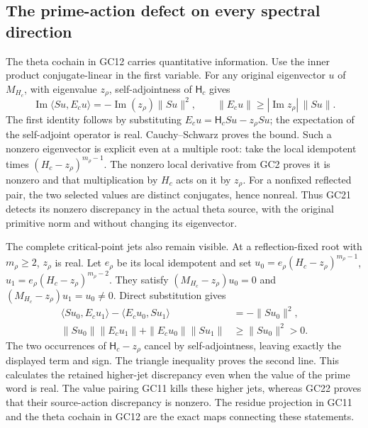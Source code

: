 \subsection{The prime-action defect on every spectral direction}
The theta cochain in GC12 carries quantitative information.
Use the inner product conjugate-linear in the first variable.
For any original eigenvector $u$ of $M_{H_c}$, with eigenvalue
$z_\rho$, self-adjointness of $\mathsf H_c$ gives
\[
 \operatorname{Im}\langle Su,E_cu\rangle
       =-\operatorname{Im}(z_\rho)\|Su\|^2,
 \qquad
 \|E_cu\|\ge |\operatorname{Im}z_\rho|\,\|Su\|.
 \tag{GC21}\label{gc:nonreal-defect}
\]
The first identity follows by substituting
$E_cu=\mathsf H_cSu-z_\rho Su$; the expectation of the
self-adjoint operator is real. Cauchy--Schwarz proves the bound.
Such a nonzero eigenvector is explicit even at a multiple root:
take the local idempotent times $(H_c-z_\rho)^{m_\rho-1}$.
The nonzero local derivative from GC2 proves it is nonzero and
that multiplication by $H_c$ acts on it by $z_\rho$.
For a nonfixed reflected pair, the two selected values are
distinct conjugates, hence nonreal. Thus GC21 detects its
nonzero discrepancy in the actual theta source, with the
original primitive norm and without changing its eigenvector.

The complete critical-point jets also remain visible. At a
reflection-fixed root with $m_\rho\ge2$, $z_\rho$ is real. Let
$e_\rho$ be its local idempotent and set
$u_0=e_\rho(H_c-z_\rho)^{m_\rho-1}$,
$u_1=e_\rho(H_c-z_\rho)^{m_\rho-2}$. They satisfy
$(M_{H_c}-z_\rho)u_0=0$ and
$(M_{H_c}-z_\rho)u_1=u_0\ne0$. Direct substitution gives
\[
\begin{split}
 \langle Su_0,E_cu_1\rangle-\langle E_cu_0,Su_1\rangle
       &=-\|Su_0\|^2,\\
 \|Su_0\|\|E_cu_1\|+\|E_cu_0\|\|Su_1\|
       &\ge\|Su_0\|^2>0.
\end{split}
 \tag{GC22}\label{gc:jet-defect}
\]
The two occurrences of $\mathsf H_c-z_\rho$ cancel by
self-adjointness, leaving exactly the displayed term and sign.
The triangle inequality proves the second line. This calculates
the retained higher-jet discrepancy even when the value of the
prime word is real. The value pairing GC11 kills these higher
jets, whereas GC22 proves that their source-action discrepancy
is nonzero. The residue projection in GC11 and the theta
cochain in GC12 are the exact maps connecting these statements.

